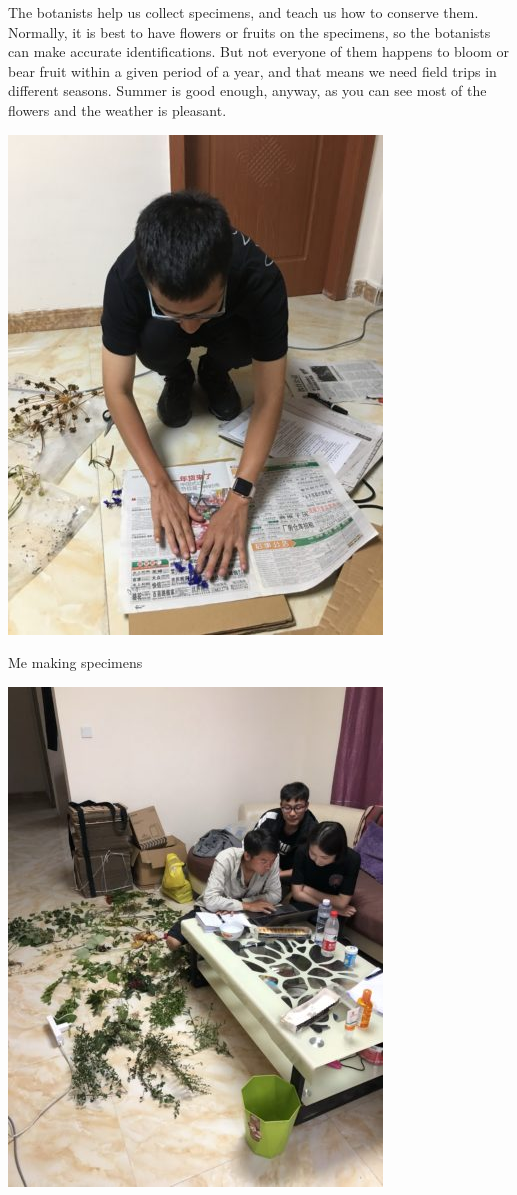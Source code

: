 \documentclass[
  a4paper,
  14pt,
  oneside,
  tablecaptionabove
]{scrbook}
\begin{document}
The botanists help us collect specimens, and teach us how to conserve
them. Normally, it is best to have flowers or fruits on the specimens,
so the botanists can make accurate identifications. But not everyone of
them happens to bloom or bear fruit within a given period of a year, and
that means we need field trips in different seasons. Summer is good
enough, anyway, as you can see most of the flowers and the weather is
pleasant.

\leavevmode\hypertarget{attachment_2135}{}%
\includegraphics[width=3.90625in,height=5.20833in]{images/IMG_7423-e1575732106557-375x500.jpg}

Me making specimens

\leavevmode\hypertarget{attachment_2147}{}%
\includegraphics[width=3.90625in,height=5.20833in]{images/IMG_9705-375x500.jpg}
\end{document}
